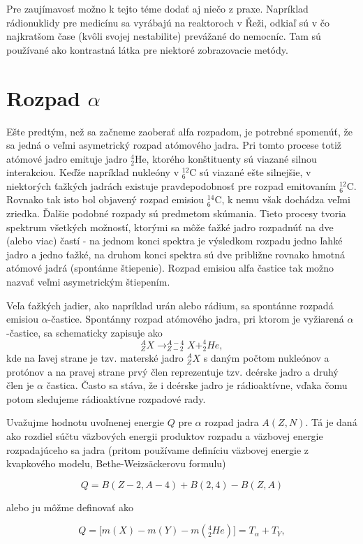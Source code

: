 \documentclass[../../main.tex]{subfiles}
\begin{document}
Pre zaujímavosť možno k tejto téme dodať aj niečo z praxe. Napríklad rádionuklidy pre medicínu sa vyrábajú na reaktoroch v Řeži, odkiaľ sú v čo najkratšom čase (kvôli svojej nestabilite) prevážané do nemocníc. Tam sú používané ako kontrastná látka pre niektoré zobrazovacie metódy.

\section{Rozpad $\alpha$}
Ešte predtým, než sa začneme zaoberať alfa rozpadom, je potrebné spomenúť, že sa jedná o veľmi asymetrický rozpad atómového jadra. Pri tomto procese totiž atómové jadro emituje jadro $_{2}^4$He, ktorého konštituenty sú viazané silnou interakciou. Keďže napríklad nukleóny v $_{6}^{12}$C sú viazané ešte silnejšie, v niektorých ťažkých jadrách existuje pravdepodobnosť pre rozpad emitovaním $_{6}^{12}$C. Rovnako tak isto bol objavený rozpad emisiou $_{6}^{14}$C, k nemu však dochádza veľmi zriedka. Ďalšie podobné rozpady sú predmetom skúmania. Tieto procesy tvoria spektrum všetkých možností, ktorými sa môže ťažké jadro rozpadnúť na dve (alebo viac) častí - na jednom konci spektra je výsledkom rozpadu jedno ľahké jadro a jedno ťažké, na druhom konci spektra sú dve približne rovnako hmotná atómové jadrá (spontánne štiepenie).
Rozpad emisiou alfa častice tak možno nazvať veľmi asymetrickým štiepením.

Veľa ťažkých jadier, ako napríklad urán alebo rádium, sa spontánne rozpadá emisiou $\alpha$-častice. Spontánny rozpad atómového jadra, pri ktorom je vyžiarená $\alpha$-častice, sa schematicky zapisuje ako
$$ _Z^AX \rightarrow _{Z-2}^{A-4}X + _2^4He, $$
kde na ľavej strane je tzv. materské jadro $_Z^AX$ s daným počtom nukleónov a protónov a na pravej strane prvý člen reprezentuje tzv. dcérske jadro a druhý člen je $\alpha$ častica. Často sa stáva, že i dcérske jadro je rádioaktívne, vďaka čomu potom sledujeme rádioaktívne rozpadové rady.

Uvažujme hodnotu uvoľnenej energie $Q$ pre $\alpha$ rozpad jadra $A(Z,N)$. Tá je daná ako rozdiel súčtu väzbových energii produktov rozpadu a väzbovej energie rozpadajúceho sa jadra (pritom používame definíciu väzbovej energie z kvapkového modelu, Bethe-Weizsäckerovu formulu)

$$ Q = B(Z-2, A-4)+B(2,4)-B(Z,A) $$

alebo ju môžme definovať ako 

$$ Q = \big[ m(X)-m(Y)-m(^4_2He) \big] = T_{\alpha} + T_Y, $$
\end{document}
